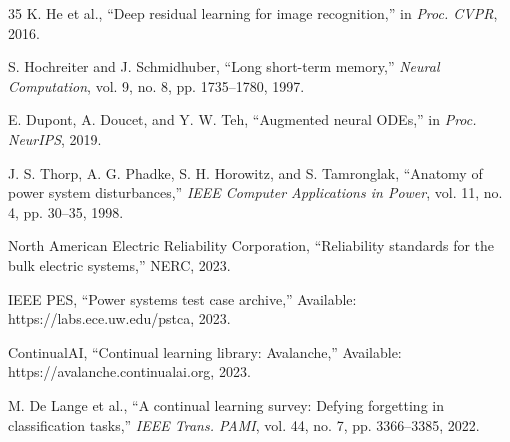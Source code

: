 \documentclass[journal,12pt,onecolumn]{IEEEtran}
\begin{document}
\begin{thebibliography}{35}
K. He et al., ``Deep residual learning for image recognition,'' in \emph{Proc. CVPR}, 2016.

S. Hochreiter and J. Schmidhuber, ``Long short-term memory,'' \emph{Neural Computation}, vol. 9, no. 8, pp. 1735--1780, 1997.

E. Dupont, A. Doucet, and Y. W. Teh, ``Augmented neural ODEs,'' in \emph{Proc. NeurIPS}, 2019.

J. S. Thorp, A. G. Phadke, S. H. Horowitz, and S. Tamronglak, ``Anatomy of power system disturbances,'' \emph{IEEE Computer Applications in Power}, vol. 11, no. 4, pp. 30--35, 1998.

North American Electric Reliability Corporation, ``Reliability standards for the bulk electric systems,'' NERC, 2023.

IEEE PES, ``Power systems test case archive,'' Available: https://labs.ece.uw.edu/pstca, 2023.

ContinualAI, ``Continual learning library: Avalanche,'' Available: https://avalanche.continualai.org, 2023.

M. De Lange et al., ``A continual learning survey: Defying forgetting in classification tasks,'' \emph{IEEE Trans. PAMI}, vol. 44, no. 7, pp. 3366--3385, 2022.

\end{thebibliography}
\end{document}
